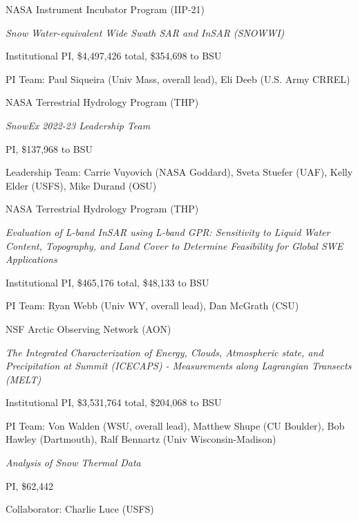 \documentclass[11pt]{article}
\renewenvironment{itemize}{
  \begin{list}{}{
    \setlength{\leftmargin}{1.5em}
    \setlength{\itemsep}{0pt}
    \setlength{\parskip}{0pt}
  }
}{
  \end{list}
}
\begin{document}
\begin{itemize}
\item[1/2022-2/2025] NASA Instrument Incubator Program (IIP-21)  
\begin{itemize}
\item \textit{Snow Water-equivalent Wide Swath SAR and InSAR (SNOWWI) }
\item Institutional PI, \$4,497,426  total, \$354,698 to BSU
\item PI Team: Paul Siqueira (Univ Mass, overall lead), Eli Deeb (U.S. Army CRREL)
\end{itemize}

\item[6/2022-9/2024] NASA Terrestrial Hydrology Program (THP) 
\begin{itemize}
\item \textit{SnowEx 2022-23 Leadership Team}
\item PI, \$137,968 to BSU
\item Leadership Team: Carrie Vuyovich (NASA Goddard), Sveta Stuefer (UAF), Kelly Elder (USFS), Mike Durand (OSU)
\end{itemize}

\item[1/2022-12/2024]  NASA Terrestrial Hydrology Program (THP) 
\begin{itemize}
\item \textit{Evaluation of L-band InSAR using L-band GPR: Sensitivity to Liquid Water Content, Topography, and Land Cover to Determine Feasibility for Global SWE Applications}
\item Institutional PI, \$465,176 total, \$48,133 to BSU 
\item PI Team: Ryan Webb (Univ WY, overall lead), Dan McGrath (CSU)
\end{itemize}

\item[1/2022-11/2024] NSF Arctic Observing Network (AON) 
\begin{itemize}
\item \textit{The Integrated Characterization of Energy, Clouds, Atmospheric state, and Precipitation at
Summit (ICECAPS) - Measurements along Lagrangian Transects (MELT)}
\item Institutional PI, \$3,531,764 total, \$204,068 to BSU
\item PI Team: Von Walden (WSU, overall lead), Matthew Shupe (CU Boulder), Bob Hawley (Dartmouth), Ralf Bennartz (Univ Wisconsin-Madison)
\end{itemize}

\item[10/2021-9/2024] 
\begin{itemize}
\item \textit{Analysis of Snow Thermal Data}
\item PI, \$62,442 
\item Collaborator: Charlie Luce (USFS)
\end{itemize}


\end{itemize}
\end{document}
